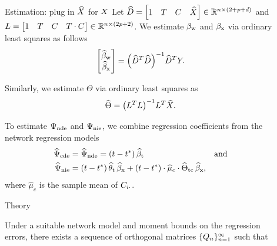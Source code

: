 \documentclass[final]{beamer}
\newlength{\sepwidth}
\newlength{\colwidth}
\newcommand{\separatorcolumn}{\begin{column}{\sepwidth}\end{column}}
\begin{document}
\begin{frame}[t]
\begin{columns}[t]
\begin{column}{\colwidth}
    \end{column}

    \separatorcolumn

    \begin{column}{\colwidth}

      \begin{block}{Estimation: plug in $\widehat{X}$ for $X$}
        Let $\widehat{D} = \begin{bmatrix} 1 & T & C& \widehat{X} \end{bmatrix} \in \mathbb{R}^{n \times (2 + p + d)}$ and $L = \begin{bmatrix} 1 & T & C & T \cdot C \end{bmatrix} \in \mathbb{R}^{n \times (2 p + 2)}$. We estimate $\beta_\text{w}$ and $\beta_\text{x}$ via ordinary least squares as follows
        \begin{equation*}
          \begin{bmatrix}
            \betawhat \\
            \betaxhat
          \end{bmatrix}
          = \paren*{\Dhat^T \Dhat}^{-1} \Dhat^T Y.
        \end{equation*}

        Similarly, we estimate $\Theta$ via ordinary least squares as
        \begin{equation*}
          \Thetahat
          = \paren*{\Wfull^T \Wfull}^{-1} \Wfull^T \Xhat.
        \end{equation*}

        To estimate $\Psi_\mathrm{nde}$ and $\Psi_\mathrm{nie}$, we combine regression coefficients from the network regression models
        \begin{align*}
          \cdehat & = \ndehat = \paren*{t - t^*} \, \betathat                                                                              & \text{and} \\
          \niehat & = \paren*{t - t^*} \, \thetathat \, \betaxhat + \paren*{t - t^*} \cdot \widehat{\mu}_c \cdot \Thetatchat \, \betaxhat,
        \end{align*}
        where $\widehat{\mu}_c$ is the sample mean of $C_{i \cdot}$.
      \end{block}

      \begin{exampleblock}{Theory}

        Under a suitable network model and moment bounds on the regression errors, there exists a sequence of orthogonal matrices $\{Q_n\}_{n=1}^\infty$ such that


\end{exampleblock}
\end{column}
\end{columns}
\end{frame}
\end{document}
